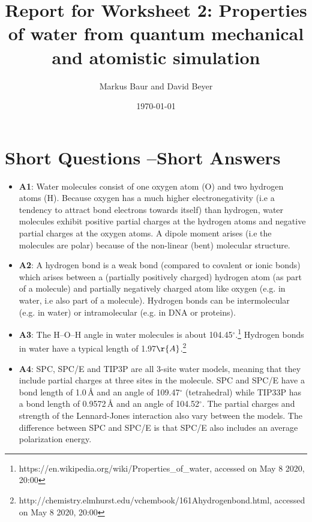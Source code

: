 \documentclass[a4paper,10pt,bibtotoc]{scrartcl}
\begin{document}
\titlehead{Simulation Methods in Physics II \hfill SS 2020}
\title{Report for Worksheet 2: Properties of water from quantum mechanical and atomistic simulation}
\author{Markus Baur and David Beyer}
\date{\today}
\maketitle

\tableofcontents

\section{Short Questions --Short Answers}
\begin{itemize}
\item \textbf{A1}: Water molecules consist of one oxygen atom (O) and two hydrogen atoms (H). Because oxygen has a much higher electronegativity (i.e a tendency to attract bond electrons towards itself) than hydrogen, water molecules exhibit positive partial charges at the hydrogen atoms and negative partial charges at the oxygen atoms. A dipole moment arises (i.e the molecules are polar) because of the non-linear (bent) molecular structure.

\item \textbf{A2}: A hydrogen bond is a weak bond (compared to covalent or ionic bonds) which arises between a (partially positively charged) hydrogen atom (as part of a molecule) and partially negatively charged atom like oxygen (e.g. in water, i.e also part of a molecule). Hydrogen bonds can be intermolecular (e.g. in water) or intramolecular (e.g. in DNA or proteins).

\item \textbf{A3}: The H--O--H angle in water molecules is about 104.45$^\circ$.\footnote{https://en.wikipedia.org/wiki/Properties\_of\_water, accessed on May 8 2020, 20:00} Hydrogen bonds in water have a typical length of 1.97$\r{A}$.\footnote{http://chemistry.elmhurst.edu/vchembook/161Ahydrogenbond.html, accessed on May 8 2020, 20:00}

\item \textbf{A4}: SPC, SPC/E and TIP3P are all 3-site water models, meaning that they include partial charges at three sites in the molecule. SPC and SPC/E have a bond length of 1.0$\,$\r{A} and an angle of 109.47$^\circ$ (tetrahedral) while TIP33P has a bond length of 0.9572$\,$\r{A} and an angle of 104.52$^\circ$. The partial charges and strength of the Lennard-Jones interaction also vary between the models. The difference between SPC and SPC/E is that SPC/E also includes an average polarization energy.
\end{itemize}
\end{document}
